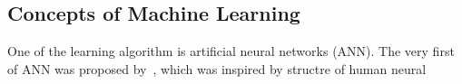 \subsection{Concepts of Machine Learning}
One of the learning algorithm is artificial neural networks (ANN). The very first of ANN was proposed by~\citet{McCulloch_1943}, which was inspired by structre of human neural 